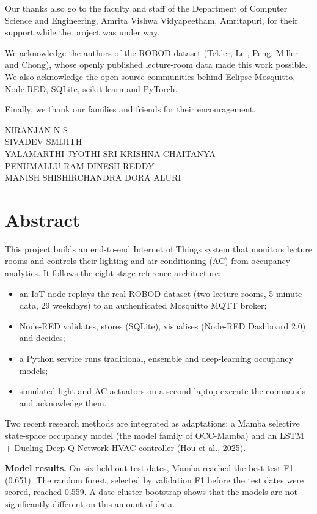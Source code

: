 \documentclass[12pt,a4paper,oneside]{report}
\begin{document}
Our thanks also go to the faculty and staff of the Department of Computer Science and Engineering, Amrita Vishwa
Vidyapeetham, Amritapuri, for their support while the project was under way.

We acknowledge the authors of the ROBOD dataset (Tekler, Lei, Peng, Miller and Chong), whose openly published
lecture-room data made this work possible. We also acknowledge the open-source communities behind Eclipse
Mosquitto, Node-RED, SQLite, scikit-learn and PyTorch.

Finally, we thank our families and friends for their encouragement.

\vspace{10mm}
\noindent NIRANJAN N S\\
SIVADEV SMIJITH\\
YALAMARTHI JYOTHI SRI KRISHNA CHAITANYA\\
PENUMALLU RAM DINESH REDDY\\
MANISH SHISHIRCHANDRA DORA ALURI

\chapter*{Abstract}
This project builds an end-to-end Internet of Things system that monitors lecture rooms and controls their lighting
and air-conditioning (AC) from occupancy analytics. It follows the eight-stage reference architecture:

\begin{itemize}
\item an IoT node replays the real ROBOD dataset (two lecture rooms, 5-minute data, 29 weekdays) to an
  authenticated Mosquitto MQTT broker;
\item Node-RED validates, stores (SQLite), visualises (Node-RED Dashboard 2.0) and decides;
\item a Python service runs traditional, ensemble and deep-learning occupancy models;
\item simulated light and AC actuators on a second laptop execute the commands and acknowledge them.
\end{itemize}

Two recent research methods are integrated as adaptations: a Mamba selective state-space occupancy model (the model
family of OCC-Mamba) and an LSTM + Dueling Deep Q-Network HVAC controller (Hou et al., 2025).

\textbf{Model results.} On six held-out test dates, Mamba reached the best test F1 (0.651). The random forest, selected
by validation F1 before the test dates were scored, reached 0.559. A date-cluster bootstrap shows that the models are
not significantly different on this amount of data.
\end{document}
